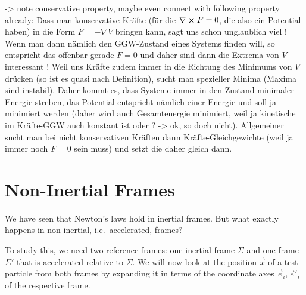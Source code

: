 \documentclass[../class_mech_main.tex]{subfiles}
\begin{document}
-> note conservative property, maybe even connect with following property already: Dass man konservative Kräfte (für die $\nabla \cross F = 0$, die also ein Potential haben) in die Form $F = - \nabla V$ bringen kann, sagt uns schon unglaublich viel ! Wenn man dann nämlich den GGW-Zustand eines Systems finden will, so entspricht das offenbar gerade $F = 0$ und daher sind dann die Extrema von $V$ interessant ! Weil uns Kräfte zudem immer in die Richtung des Minimums von $V$ drücken (so ist es quasi nach Definition), sucht man spezieller Minima (Maxima sind instabil). Daher kommt es, dass Systeme immer in den Zustand minimaler Energie streben, das Potential entspricht nämlich einer Energie und soll ja minimiert werden (daher wird auch Gesamtenergie minimiert, weil ja kinetische im Kräfte-GGW auch konstant ist oder ? -> ok, so doch nicht). Allgemeiner sucht man bei nicht konservativen Kräften dann Kräfte-Gleichgewichte (weil ja immer noch $F = 0$ sein muss) und setzt die daher gleich dann.



\newpage



    \section{Non-Inertial Frames}
We have seen that Newton's laws hold in inertial frames. But what exactly happens in non-inertial, i.e.~accelerated, frames?

To study this, we need two reference frames: one inertial frame $\Sigma$ and one frame $\Sigma'$ that is accelerated relative to $\Sigma$. We will now look at the position $\vec{x}$ of a test particle from both frames by expanding it in terms of the coordinate axes $\vec{e}_i, \vec{e}'_i$ of the respective frame.
\end{document}
